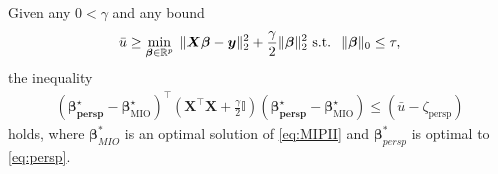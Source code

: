 \documentclass[ijoc,noblindrev]{informs3} %
\begin{document}
\begin{theorem}\label{prop:kfoldspread}
	Given any $0 < \gamma$ and any bound
	\begin{equation}\label{eq:MIPII}
		\bar u\geq \min_{\bm{\beta}\in \mathbb{R}^p}\; \|\bm{X}\bm{\beta}-\bm{y}\|_2^2+\frac{\gamma}{2}\|\bm{\beta}\|_2^2
		\text{\rm\ s.t. }\; \|\bm{\beta}\|_0\leq \tau,
	\end{equation} 
	the inequality
	\begin{align}\label{ineq:perspbound}
		(\bm{\beta^\star_{\text{persp}}}- \bm{\beta}^\star_{\text{MIO}})^\top \left(\bm{X}^\top \bm{X}+\frac{\gamma}{2} \bm{\mathbb{I}}\right) (\bm{\beta^\star_{\text{persp}}}- \bm{\beta}^\star_{\text{MIO}}) \leq (\bar{u}-\zeta_{\text{persp}})
	\end{align}
	holds, where $\bm{\beta}_{MIO}^*$ is an optimal solution of \eqref{eq:MIPII} and $\bm{\beta}_{persp}^*$ is optimal to \eqref{eq:persp}.
\end{theorem}
\end{document}
